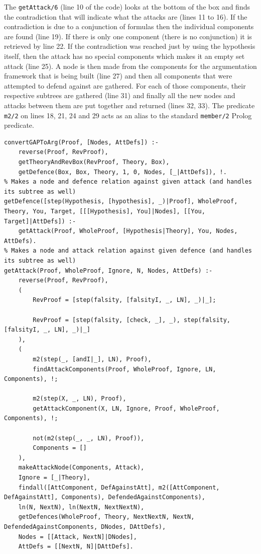 \documentclass[11pt,twoside,a4paper]{report}
\begin{document}
The \lstinline$getAttack/6$ (line 10 of the code) looks at the bottom of the box and finds the contradiction that will indicate what the attacks are (lines 11 to 16). If the contradiction is due to a conjunction of formulas then the individual components are found (line 19). If there is only one component (there is no conjunction) it is retrieved by line 22. If the contradiction was reached just by using the hypothesis itself, then the attack has no special components which makes it an empty set attack (line 25). A node is then made from the components for the argumentation framework that is being built (line 27) and then all components that were attempted to defend against are gathered. For each of those components, their respective subtrees are gathered (line 31) and finally all the new nodes and attacks between them are put together and returned (lines 32, 33). The predicate \lstinline$m2/2$ on lines 18, 21, 24 and 29 acts as an alias to the standard \lstinline$member/2$ Prolog predicate.

\begin{lstlisting}[caption={First part of the proof visualization algorithm},label=lst:argviz1]
% Converts a GAP proof to its argumentation representation
convertGAPToArg(Proof, [Nodes, AttDefs]) :-
	reverse(Proof, RevProof),
	getTheoryAndRevBox(RevProof, Theory, Box),
	getDefence(Box, Box, Theory, 1, 0, Nodes, [_|AttDefs]), !.
% Makes a node and defence relation against given attack (and handles its subtree as well)
getDefence([step(Hypothesis, [hypothesis], _)|Proof], WholeProof, Theory, You, Target, [[[Hypothesis], You]|Nodes], [[You, Target]|AttDefs]) :-
	getAttack(Proof, WholeProof, [Hypothesis|Theory], You, Nodes, AttDefs).
% Makes a node and attack relation against given defence (and handles its subtree as well)
getAttack(Proof, WholeProof, Ignore, N, Nodes, AttDefs) :-
	reverse(Proof, RevProof),
	(
		RevProof = [step(falsity, [falsityI, _, LN], _)|_];
		
		RevProof = [step(falsity, [check, _], _), step(falsity, [falsityI, _, LN], _)|_]
	),
	(
		m2(step(_, [andI|_], LN), Proof),
		findAttackComponents(Proof, WholeProof, Ignore, LN, Components), !;
		
		m2(step(X, _, LN), Proof),
		getAttackComponent(X, LN, Ignore, Proof, WholeProof, Components), !;
		
		not(m2(step(_, _, LN), Proof)),
		Components = []
	),
	makeAttackNode(Components, Attack),
	Ignore = [_|Theory],
	findall([AttComponent, DefAgainstAtt], m2([AttComponent, DefAgainstAtt], Components), DefendedAgainstComponents),
	ln(N, NextN), ln(NextN, NextNextN),
	getDefences(WholeProof, Theory, NextNextN, NextN, DefendedAgainstComponents, DNodes, DAttDefs),
	Nodes = [[Attack, NextN]|DNodes],
	AttDefs = [[NextN, N]|DAttDefs].
\end{lstlisting}
\end{document}
